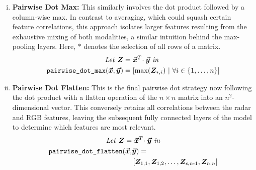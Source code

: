 \documentclass{mpaper}
\newcommand{\verbtt}[1]{
  \text{\normalfont\ttfamily\detokenize{#1}}
}
\begin{document}
\begin{enumerate}[i.]
    \item \textbf{Pairwise Dot Max:} This similarly involves the dot product followed by a column-wise max. In contrast to averaging, which could squash certain feature correlations, this approach isolates larger features resulting from the exhaustive mixing of both modalities, a similar intuition behind the max-pooling layers. Here, $*$ denotes the selection of all rows of a matrix.
    \begin{align*}
        \mathit{Let} \ \bm{Z} & = \bm{\vec{x}}^T\!\cdot \bm{\vec{y}} \ \mathit{in} \\
        \verbtt{pairwise_dot_max}(\bm{\vec{x}}, \bm{\vec{y}}) &= \left[ \max(\bm{Z}_{*,i}) \ \middle| \ \forall i \in \{1, \ldots, n\} \right]
    \end{align*}
    
    \item \textbf{Pairwise Dot Flatten:} This is the final pairwise dot strategy now following the dot product with a flatten operation of the $n \times n$ matrix into an $n^2$-dimensional vector. This conversely retains all correlations between the radar and RGB features, leaving the subsequent fully connected layers of the model to determine which features are most relevant.
    \vspace*{-0.1cm}
    \begin{align*}
        \mathit{Let} \ \bm{Z} = & \ \bm{\vec{x}}^T\!\cdot \bm{\vec{y}} \ \mathit{in} \\
        \verbtt{pairwise_dot_flatten}(\bm{\vec{x}}, &\bm{\vec{y}}) =\\ &\left[ \bm{Z}_{1,1}, \bm{Z}_{1,2}, \ldots, \bm{Z}_{n\!,n\text{-}1}, \bm{Z}_{n,n} \right]
    \end{align*} 
    \vspace*{-0.8cm}


\end{enumerate}
\end{document}
